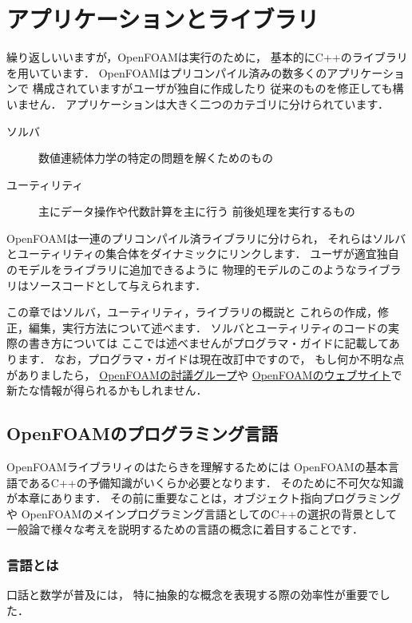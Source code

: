 \chapter{アプリケーションとライブラリ}
\label{chap:3}
%
%
%
%
繰り返しいいますが，OpenFOAMは実行のために，
基本的にC++のライブラリを用いています．
OpenFOAMはプリコンパイル済みの数多くのアプリケーションで
構成されていますがユーザが独自に作成したり
従来のものを修正しても構いません．
アプリケーションは大きく二つのカテゴリに分けられています．
\begin{description}
 \item[ソルバ] 数値連続体力学の特定の問題を解くためのもの
 \item[ユーティリティ] 主にデータ操作や代数計算を主に行う
            前後処理を実行するもの
\end{description}
OpenFOAMは一連のプリコンパイル済ライブラリに分けられ，
それらはソルバとユーティリティの集合体をダイナミックにリンクします．
ユーザが適宜独自のモデルをライブラリに追加できるように
物理的モデルのこのようなライブラリはソースコードとして与えられます．

この章ではソルバ，ユーティリティ，ライブラリの概説と
これらの作成，修正，編集，実行方法について述べます．
ソルバとユーティリティのコードの実際の書き方については
ここでは述べませんがプログラマ・ガイドに記載してあります．
なお，プログラマ・ガイドは現在改訂中ですので，
もし何か不明な点がありましたら，
\href{http://tfdpc67.tfd.chalmers.se/foam/discus/index.html}{OpenFOAMの討議グループ}や
\href{http://www.openfoam.org}{OpenFOAMのウェブサイト}で
新たな情報が得られるかもしれません．



\section{OpenFOAMのプログラミング言語}
\label{sec:3.1}
OpenFOAMライブラリィのはたらきを理解するためには
OpenFOAMの基本言語であるC++の予備知識がいくらか必要となります．
そのために不可欠な知識が本章にあります．
その前に重要なことは，オブジェクト指向プログラミングや
OpenFOAMのメインプログラミング言語としてのC++の選択の背景として
一般論で様々な考えを説明するための言語の概念に着目することです．


\subsection{言語とは}
\label{ssec:3.1.1}
口話と数学が普及には，
特に抽象的な概念を表現する際の効率性が重要でした．

